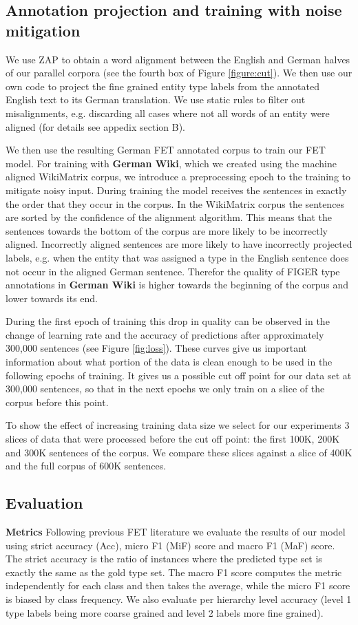 \documentclass[11pt,a4paper]{article}
\begin{document}
\subsection{Annotation projection and training with noise mitigation }
We use ZAP to obtain a word alignment between the English and German halves of our parallel corpora (see the fourth box of Figure \ref{figure:cut}). We then use our own code to project the fine grained entity type labels from the annotated English text to its German translation. We use static rules to filter out misalignments, e.g. discarding all cases where not all words of an entity were aligned (for details see appedix section B).

We then use the resulting German FET annotated corpus to train our FET model. For training with \textbf{German Wiki}, which we created using the machine aligned WikiMatrix corpus, we introduce a preprocessing epoch to the training to mitigate noisy input. During training the model receives the sentences in exactly the order that they occur in the corpus. In the WikiMatrix corpus the sentences are sorted by the confidence of the alignment algorithm. This means that the sentences towards the bottom of the corpus are more likely to be incorrectly aligned. Incorrectly aligned sentences are more likely to have incorrectly projected labels, e.g. when the entity that was assigned a type in the English sentence does not occur in the aligned German sentence. Therefor the quality of FIGER type annotations in \textbf{German Wiki} is higher towards the beginning of the corpus and lower towards its end.

During the first epoch of training this drop in quality can be observed in the change of learning rate and the accuracy of predictions after approximately 300,000 sentences (see Figure \ref{fig:loss}). These curves give us important information about what portion of the data is clean enough to be used in the following epochs of training. It gives us a possible cut off point for our data set at 300,000 sentences, so that in the next epochs we only train on a slice of the corpus before this point.

To show the effect of increasing training data size we select for our experiments 3 slices of data that were processed before the cut off point: the first 100K, 200K and 300K sentences of the corpus. We compare these slices against a slice of 400K and the full corpus of 600K sentences. 



\subsection{Evaluation}
\textbf{Metrics}
Following previous FET literature we evaluate the results of our model using strict accuracy (Acc), micro F1 (MiF)  score and macro F1 (MaF) score. The strict accuracy is the ratio of instances where the predicted type set is exactly the same as the gold type set. The macro F1 score computes the metric independently for each class and then takes the average, while the micro F1 score is biased by class frequency. We also evaluate per hierarchy level accuracy (level 1 type labels being more coarse grained and level 2 labels more fine grained). 
\end{document}
